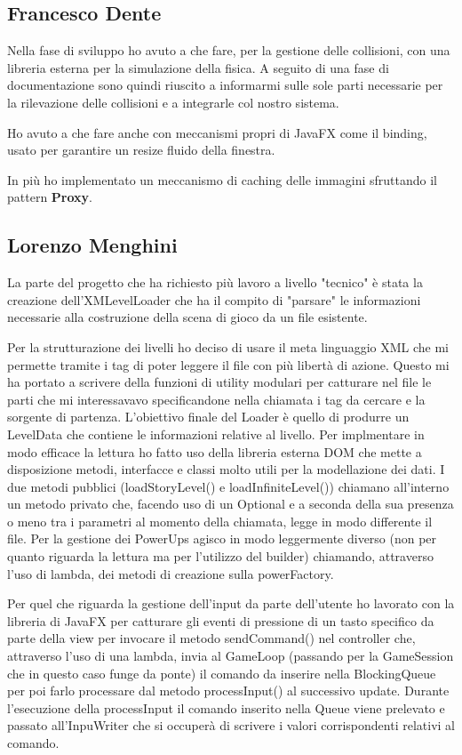 \documentclass[a4paper,12pt]{report}
\begin{document}
\subsection*{Francesco Dente}
Nella fase di sviluppo ho avuto a che fare, per la gestione delle collisioni, con una libreria esterna per la simulazione della fisica.
A seguito di una fase di documentazione sono quindi riuscito a informarmi sulle sole parti necessarie per la rilevazione delle collisioni e a integrarle col nostro sistema.

Ho avuto a che fare anche con meccanismi propri di JavaFX come il binding, usato per garantire un resize fluido della finestra.

In più ho implementato un meccanismo di caching delle immagini sfruttando il pattern \textbf{Proxy}.

\subsection*{Lorenzo Menghini}
La parte del progetto che ha richiesto più lavoro a livello "tecnico" è stata la creazione dell'XMLevelLoader che ha il compito di "parsare" le informazioni necessarie alla costruzione della scena di gioco da un file esistente.

Per la strutturazione dei livelli ho deciso di usare il meta linguaggio XML che mi permette tramite i tag di poter leggere il file con più libertà di azione.
Questo mi ha portato a scrivere della funzioni di utility modulari per catturare nel file le parti che mi interessavavo specificandone nella chiamata i tag da cercare e la sorgente di partenza.
L'obiettivo finale del Loader è quello di produrre un LevelData che contiene le informazioni relative al livello.
Per implmentare in modo efficace la lettura ho fatto uso della libreria esterna DOM che mette a disposizione metodi, interfacce e classi molto utili per la modellazione dei dati.
I due metodi pubblici (loadStoryLevel() e loadInfiniteLevel()) chiamano all'interno un metodo privato che, facendo uso di un Optional e a seconda della sua presenza o meno tra i parametri al momento della chiamata, legge in modo differente il file.
Per la gestione dei PowerUps agisco in modo leggermente diverso (non per quanto riguarda la lettura ma per l'utilizzo del builder) chiamando, attraverso l'uso di lambda, dei metodi di creazione sulla powerFactory. 

Per quel che riguarda la gestione dell'input da parte dell'utente ho lavorato con la libreria di JavaFX per catturare gli eventi di pressione di un tasto specifico da parte della view per invocare il metodo sendCommand() nel controller che, attraverso l'uso di una lambda, invia al GameLoop (passando per la GameSession che in questo caso funge da ponte) il comando da inserire nella BlockingQueue per poi farlo processare dal metodo processInput() al successivo update.
Durante l'esecuzione della processInput il comando inserito nella Queue viene prelevato e passato all'InpuWriter che si occuperà di scrivere i valori corrispondenti relativi al comando.
\end{document}
